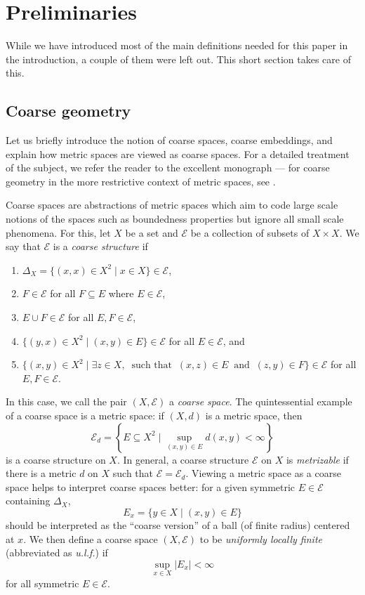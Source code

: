 \documentclass[11pt]{amsart}
\newcommand{\cE}{\mathcal{E}}
\numberwithin{equation}{section}
\theoremstyle{definition}
\theoremstyle{remark}
\begin{document}
\section{Preliminaries}\label{Section.Preliminaries}

While we have introduced most of the main definitions needed for this paper in the introduction, a couple of them were left out. This   short section takes care of this.

 \subsection{Coarse geometry}\label{SubsectionCoarseSpaces}
Let us briefly introduce the notion of coarse spaces, coarse embeddings, and explain how metric spaces are viewed as coarse spaces. For a detailed treatment of the subject, we refer the reader to the excellent monograph \cite{RoeBook} --- for coarse geometry in the more restrictive context of metric spaces, see \cite{NowakYuBook}.

Coarse spaces are abstractions of metric spaces which aim to code large scale notions of the spaces such as boundedness properties  but ignore all small scale phenomena. For this, let $X$ be a set and $\cE $ be a collection of subsets of $X\times X$. We say that $\cE$ is a \emph{coarse structure} if
\begin{enumerate}
    \item $\Delta_X=\{(x,x)\in  X^2\mid x\in X\}\in \cE$,
    \item $F\in \cE$ for all $F\subseteq E$ where $E\in \cE$,
    \item $E\cup F\in \cE$ for all $E,F\in \cE$,
    \item $\{(y,x)\in X^2\mid (x,y)\in E\}\in \cE$ for all $E\in \cE$, and
    \item $\{(x,y)\in X^2\mid \exists z\in X,\ \text{ such that }\ (x,z)\in E\ \text{ and }\ (z,y)\in F\}\in \cE$ for all $E,F\in \cE$.
\end{enumerate}
In this case, we call the pair $(X,\cE)$ a \emph{coarse space}. The quintessential example of a coarse space is a metric space: if $(X,d)$ is a metric space, then
\[\cE_d=\left\{E\subseteq  X^2\mid \sup_{(x,y)\in E}d(x,y)<\infty\right\}\]
is a coarse structure on $X$. In general, a coarse structure $\cE$  on $X$ is \emph{metrizable} if there is a metric $d$ on $X$ such that $\cE=\cE_d$. Viewing a metric space as a coarse space helps to interpret coarse spaces better: for a given symmetric $E\in \cE$ containing $\Delta_X$,
\[E_x=\{y\in X\mid (x,y)\in E\}\]
should be interpreted as the ``coarse version'' of a ball (of finite radius) centered at $x$. We then define a   coarse space $(X,\cE)$ to be  \emph{uniformly locally finite} (abbreviated as \emph{u.l.f.}) if
\[\sup_{x\in X}|E_x|<\infty\]
for all symmetric $E\in \cE$.
\end{document}
